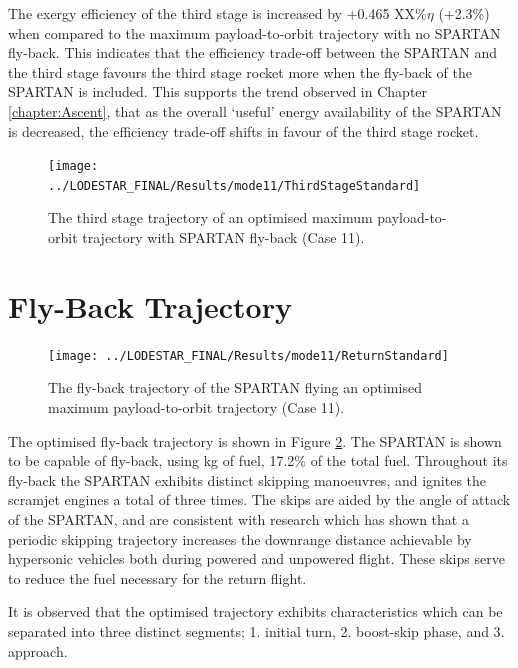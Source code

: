 The exergy efficiency of the third stage is increased by +0.465 XX\%$\eta$ (+2.3\%) when compared to the maximum payload-to-orbit trajectory with no SPARTAN fly-back. This indicates that the efficiency trade-off between the SPARTAN and the third stage favours the third stage rocket more when the fly-back of the SPARTAN is included. This supports the trend observed in Chapter \ref{chapter:Ascent}, that as the overall `useful' energy availability of the SPARTAN is decreased, the efficiency trade-off shifts in favour of the third stage rocket.  


\begin{figure}[ht!]
\centering
\texttt{[image: ../LODESTAR\_FINAL/Results/mode11/ThirdStageStandard]}
\caption{The third stage trajectory of an optimised maximum payload-to-orbit trajectory with SPARTAN fly-back (Case 11). }
\label{fig:ThirdStageStandard}
\end{figure}


\section{Fly-Back Trajectory}

\begin{figure}[ht!]
	\centering
	\texttt{[image: ../LODESTAR\_FINAL/Results/mode11/ReturnStandard]}
	\caption{The fly-back trajectory of the SPARTAN flying an optimised maximum payload-to-orbit trajectory (Case 11). }
	\label{fig:ReturnStandard}
\end{figure}

The optimised fly-back trajectory is shown in Figure \ref{fig:ReturnStandard}.
The SPARTAN is shown to be capable of fly-back, using \returnFuelStandard kg of fuel, 17.2\% of the total fuel.
Throughout its fly-back the SPARTAN exhibits distinct skipping manoeuvres, and ignites the scramjet engines a total of three times. 
The skips are aided by the angle of attack of the SPARTAN, and are consistent with research which has shown that a periodic skipping trajectory increases the downrange distance achievable by hypersonic vehicles both during powered and unpowered flight\cite{Eggers1957,Kanda2007}. These skips serve to reduce the fuel necessary for the return flight. 

It is observed that the optimised trajectory exhibits characteristics which can be separated into three distinct segments; 1. initial turn, 2. boost-skip phase, and 3. approach. 
 
